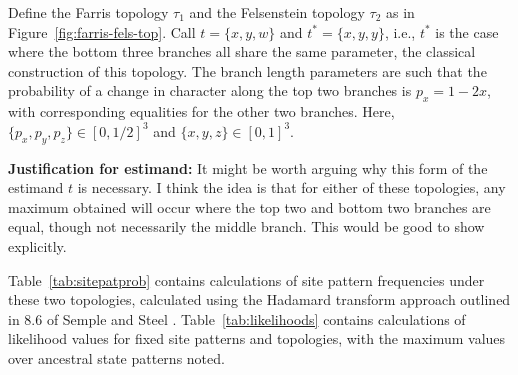 \documentclass[a4paper]{article}
\begin{document}
Define the Farris topology $\tau_1$ and the Felsenstein topology $\tau_2$ as in Figure~\ref{fig:farris-fels-top}.
Call $t=\{x,y,w\}$ and $t^*=\{x,y,y\}$, i.e., $t^*$ is the case where the bottom three branches all share the same parameter, the classical construction of this topology.
The branch length parameters are such that the probability of a change in character along the top two branches is $p_x=1-2x$, with corresponding equalities for the other two branches.
Here, $\{p_x,p_y,p_z\}\in[0,1/2]^3$ and $\{x,y,z\}\in[0,1]^3$.

\textbf{Justification for estimand:} It might be worth arguing why this form of the estimand $t$ is necessary.
I think the idea is that for either of these topologies, any maximum obtained will occur where the top two and bottom two branches are equal, though not necessarily the middle branch.
This would be good to show explicitly.

Table~\ref{tab:sitepatprob} contains calculations of site pattern frequencies under these two topologies, calculated using the Hadamard transform approach outlined in 8.6 of Semple and Steel \cite{Semple2003-em}.
Table~\ref{tab:likelihoods} contains calculations of likelihood values for fixed site patterns and topologies, with the maximum values over ancestral state patterns noted.
\end{document}
